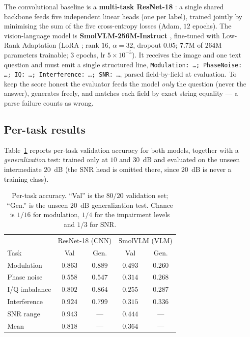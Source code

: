 \documentclass[11pt,a4paper,onecolumn,final]{article}
\begin{document}
The convolutional baseline is a \textbf{multi-task ResNet-18} \cite{He2016}: a single shared
backbone feeds five independent linear heads (one per label), trained jointly by minimising
the sum of the five cross-entropy losses (Adam, $12$ epochs). The vision-language model is
\textbf{SmolVLM-256M-Instruct} \cite{SmolVLM2025}, fine-tuned with Low-Rank Adaptation
(LoRA \cite{Hu2021}; rank $16$, $\alpha=32$, dropout $0.05$; $7.7$M of $264$M parameters
trainable; $3$ epochs, lr $5\times10^{-5}$). It receives the image and one text question and
must emit a single structured line, \texttt{Modulation: \dots; PhaseNoise: \dots; IQ: \dots;
Interference: \dots; SNR: \dots}, parsed field-by-field at evaluation. To keep the score
honest the evaluator feeds the model \emph{only} the question (never the answer), generates
freely, and matches each field by exact string equality --- a parse failure counts as wrong.

\subsection{Per-task results}
Table~\ref{tab:amc} reports per-task validation accuracy for both models, together with a
\emph{generalization} test: trained only at $10$ and $30$~dB and evaluated on the unseen
intermediate $20$~dB (the SNR head is omitted there, since $20$~dB is never a training class).

\begin{table}[htbp]
\centering
\caption{Per-task accuracy. ``Val'' is the $80/20$ validation set; ``Gen.'' is the unseen
$20$~dB generalization test. Chance is $1/16$ for modulation, $1/4$ for the impairment levels
and $1/3$ for SNR.}
\label{tab:amc}
\begin{tabular}{lcccc}
\hline
 & \multicolumn{2}{c}{ResNet-18 (CNN)} & \multicolumn{2}{c}{SmolVLM (VLM)}\\
Task & Val & Gen. & Val & Gen.\\
\hline
Modulation     & $0.863$ & $0.889$ & $0.493$ & $0.260$\\
Phase noise    & $0.558$ & $0.547$ & $0.314$ & $0.268$\\
I/Q imbalance  & $0.802$ & $0.864$ & $0.255$ & $0.287$\\
Interference   & $0.924$ & $0.799$ & $0.315$ & $0.336$\\
SNR range      & $0.943$ & ---     & $0.444$ & ---\\
\hline
Mean           & $0.818$ & --- & $0.364$ & ---\\
\hline
\end{tabular}
\end{table}
\end{document}
